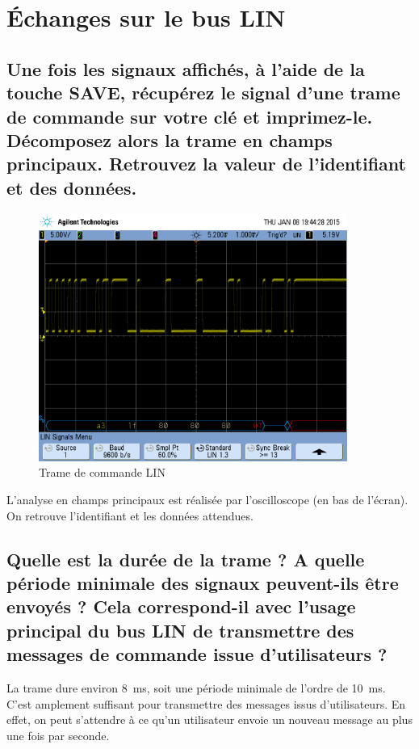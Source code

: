 \documentclass[12pt]{article}
\begin{document}
\section{Échanges sur le bus LIN}

\subsection{Une fois les signaux affichés, à l'aide de la touche SAVE, récupérez le signal d'une trame de commande sur votre clé et imprimez-le. Décomposez alors la trame en champs principaux. Retrouvez la valeur de l'identifiant et des données.}

\begin{figure}[H]
\centering
\includegraphics[width=0.9\textwidth]{releve_3.png}
\caption{Trame de commande LIN}
\end{figure}

L'analyse en champs principaux est réalisée par l'oscilloscope (en bas de l'écran). On retrouve l'identifiant et les données attendues.

\subsection{Quelle est la durée de la trame ? A quelle période minimale des signaux peuvent-ils être envoyés ? Cela correspond-il avec l'usage principal du bus LIN de transmettre des messages de commande issue d'utilisateurs ?}

La trame dure environ \SI{8}{\milli\second}, soit une période minimale de l'ordre de \SI{10}{\milli\second}. C'est amplement suffisant pour transmettre des messages issus d'utilisateurs. En effet, on peut s'attendre à ce qu'un utilisateur envoie un nouveau message au plus une fois par seconde.
\end{document}
